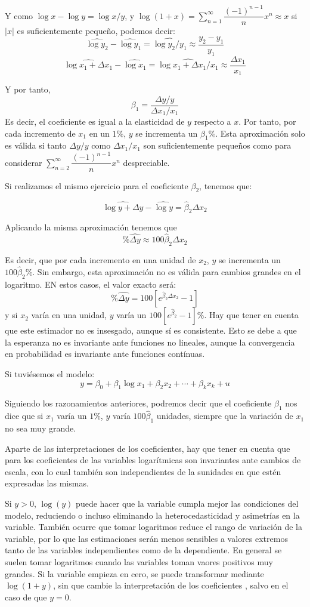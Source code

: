 Y como $\log{x}-\log{y}=\log{x/y}$, y $\log{(1+x)}=\sum_{n=1}^{\infty}\dfrac{(-1)^{n-1}}{n}x^n\approx x$ si $|x|$ es suficientemente peque\~no, podemos decir:
\[\hat{\log{y_2}}-\hat{\log{y_1}}=\hat{\log{y_2/y_1}}\approx\dfrac{y_2-y_1}{y_1}\]
\[\hat{\log{x_1+\Delta x_1}}-\hat{\log{x_1}}=\hat{\log{x_1+\Delta x_1/x_1}}\approx\dfrac{\Delta x_1}{x_1}\]

Y por tanto, 
\[\beta_1=\dfrac{\Delta y/y}{\Delta x_1/x_1}\]
Es decir, el coeficiente es igual a la elasticidad de $y$ respecto a $x$. Por tanto, por cada incremento de $x_1$ en un $1\%$, $y$ se incrementa un $\beta_1\%$. Esta aproximaci\'on solo es v\'alida si tanto $\Delta y/y$ como $\Delta x_1/x_1$ son suficientemente peque\~nos como para considerar $\sum_{n=2}^{\infty}\dfrac{(-1)^{n-1}}{n}x^n$ despreciable.

Si realizamos el mismo ejercicio para el coeficiente $\beta_2$, tenemos que:

\[\hat{\log{y+\Delta y}}-\hat{\log{y}}=\hat{\beta}_2\Delta x_2\]

Aplicando la misma aproximaci\'on tenemos que 
\[\%\hat{\Delta y}\approx100\hat{\beta}_2\Delta x_2 \]

Es decir, que por cada incremento en una unidad de $x_2$, $y$ se incrementa un $100\hat{\beta}_2\%$. Sin embargo, esta aproximaci\'on no es v\'alida para cambios grandes en el logaritmo. EN estos casos, el valor exacto ser\'a:
\[\%\hat{\Delta y}=100[e^{\hat{\beta}_2\Delta x_2}-1] \]
y si $x_2$ var\'ia en una unidad, $y$ var\'ia un $100[e^{\hat{\beta}_2}-1]\%$. Hay que tener en cuenta que este estimador no es insesgado, aunque s\'i es consistente. Esto se debe a que la esperanza no es invariante ante funciones no lineales, aunque la convergencia en probabilidad es invariante ante funciones cont\'inuas.

Si tuvi\'esemos el modelo:
\[y=\beta_0+\beta_1\log{x_1}+\beta_2x_2+\cdots+\beta_kx_k+u\]

Siguiendo los razonamientos anteriores, podremos decir que el coeficiente $\beta_1$ nos dice que si $x_1$ var\'ia un $1\%$, $y$ var\'ia $100\hat{\beta}_1$ unidades, siempre que la variaci\'on de $x_1$ no sea muy grande.

Aparte de las interpretaciones de los coeficientes, hay que tener en cuenta que para los coeficientes de las variables logar\'itmicas son invariantes ante cambios de escala, con lo cual tambi\'en son independientes de la sunidades en que est\'en expresadas las mismas.

Si $y>0$, $\log(y)$ puede hacer que la variable cumpla mejor las condiciones del modelo, reduciendo o incluso eliminando la heterocedasticidad y asimetr\'ias en la variable. Tambi\'en ocurre que tomar logaritmos reduce el rango de variaci\'on de la variable, por lo que las estimaciones ser\'an menos sensibles a valores extremos tanto de las variables independientes como de la dependiente. En general se suelen tomar logaritmos cuando las variables toman vaores positivos muy grandes. Si la variable empieza en cero, se puede transformar mediante $\log(1+y)$, sin que cambie la interpretaci\'on de los coeficientes , salvo en el caso de que $y=0$.

